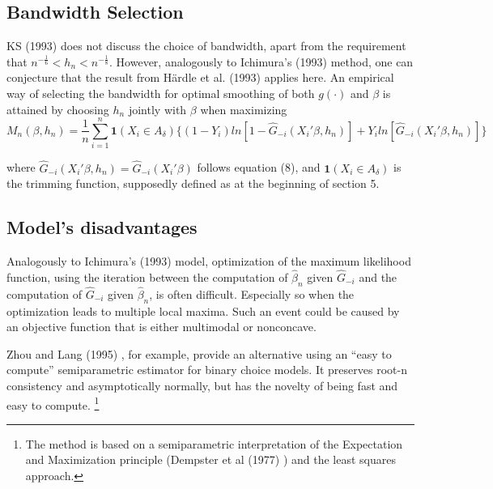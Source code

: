 \subsection{Bandwidth Selection} %
\label{sub:Bandwidth Selection}
KS (1993) \cite{[12]} does not discuss the choice of bandwidth, apart from the requirement that $ n^{-\frac{1}{6}} < h_n < n^{-\frac{1}{8}}$. However, analogously to Ichimura's (1993) \cite{[6]} method, one can conjecture that the result from H{\"a}rdle et al. (1993) \cite{[18]} applies here. An empirical way of selecting the bandwidth for optimal smoothing of both $g(\cdot)$ and $\beta$ is attained by choosing $h_n$ jointly with $\beta$ when maximizing
\begin{equation}
M_n(\beta, h_n) = \frac{1}{n}\sum_{i=1}^n \mathbf{1}{(X_i \in A_\delta)}\{ (1 - Y_i)ln[ 1 - \hat{G}_{-i}(X_i'\beta, h_n)] +  Y_iln[\hat{G}_{-i}(X_i'\beta, h_n)]\}
\end{equation}

where $\hat{G}_{-i}(X_i'\beta, h_n) = \hat{G}_{-i}(X_i'\beta)$ follows equation (8), and $\mathbf{1}{(X_i \in A_\delta)}$ is the trimming function, supposedly defined as at the beginning of section 5.

\subsection{Model's disadvantages} %
\label{sub:Model's disadvantages}
Analogously to Ichimura's (1993) \cite{[6]} model, optimization of the maximum likelihood function, using the iteration between the computation of $\hat{\beta}_n$ given $\hat{G}_{-i}$ and the computation of $\hat{G}_{-i}$ given $\hat{\beta}_n$, is often difficult.  Especially so when the optimization leads to multiple local maxima. Such an event could be caused by an objective function that is either multimodal or nonconcave. 

Zhou and Lang (1995) \cite{[26]}, for example, provide an alternative using an ``easy to compute'' semiparametric estimator for binary choice models. It preserves root-n consistency and asymptotically normally, but has the novelty of being fast and easy to compute. \footnote{The method is based on a semiparametric interpretation of the Expectation and Maximization principle (Dempster et al (1977) \cite{[27]}) and the least squares approach.}

